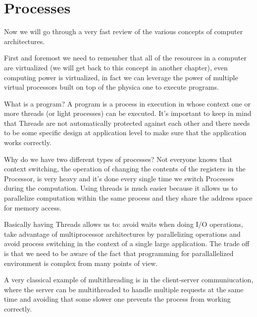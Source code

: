\chapter{Processes}
Now we will go through a very fast review of the various concepts of computer architectures.

First and foremost we need to remember that all of the resources in a computer are virtualized (we will get back to this concept in another chapter), even computing power is virtualized, in fact we can leverage the power of multiple virtual processors built on top of the physica one to execute programs.

What is a program? A program is a process in execution in whose context one or more threads (or light processes) can be executed. It's important to keep in mind that Threads are not automatically protected against each other and there needs to be some specific design at application level to make sure that the application works correctly.

Why do we have two different types of processes? Not everyone knows that context switching, the operation of changing the contents of the registers in the Processor, is very heavy and it's done every single time we switch Processes during the computation. Using threads is much easier because it allows us to parallelize computation within the same process and they share the address space for memory access.

Basically having Threads allows us to: avoid waits when doing I/O operations, take advantage of multiprocessor architectures by parallelizing operations and avoid process switching in the context of a single large application. The trade off is that we need to be aware of the fact that programming for parallallelized environment is complex from many points of view.

A very classical example of multithreading is in the client-server communiucation, where the server can be multithreaded to handle multiple requests at the same time and avoiding that some slower one prevents the process from working correctly.